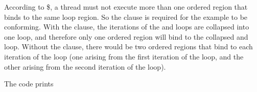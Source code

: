 According to \$, a thread must not execute more than one ordered region that binds 
to the same loop region. So the  clause is required for the example 
to be conforming. With the  clause, the iterations of the  
and  loops are collapsed into one loop, and therefore only one ordered 
region will bind to the collapsed  and  loop. Without the  
clause, there would be two ordered regions that bind to each iteration of the  
loop (one arising from the first iteration of the  loop, and the other 
arising from the second iteration of the  loop).

The code prints

\\
\\
\\
\\
\\




